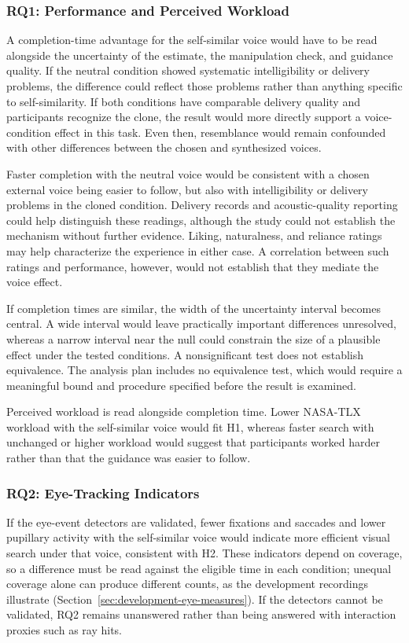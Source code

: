 \subsubsection{RQ1: Performance and Perceived Workload}
A completion-time advantage for the self-similar voice would have to be read alongside the uncertainty of the estimate, the manipulation check, and guidance quality. If the neutral condition showed systematic intelligibility or delivery problems, the difference could reflect those problems rather than anything specific to self-similarity. If both conditions have comparable delivery quality and participants recognize the clone, the result would more directly support a voice-condition effect in this task. Even then, resemblance would remain confounded with other differences between the chosen and synthesized voices.

Faster completion with the neutral voice would be consistent with a chosen external voice being easier to follow, but also with intelligibility or delivery problems in the cloned condition. Delivery records and acoustic-quality reporting could help distinguish these readings, although the study could not establish the mechanism without further evidence. Liking, naturalness, and reliance ratings may help characterize the experience in either case. A correlation between such ratings and performance, however, would not establish that they mediate the voice effect.

If completion times are similar, the width of the uncertainty interval becomes central. A wide interval would leave practically important differences unresolved, whereas a narrow interval near the null could constrain the size of a plausible effect under the tested conditions. A nonsignificant test does not establish equivalence. The analysis plan includes no equivalence test, which would require a meaningful bound and procedure specified before the result is examined.

Perceived workload is read alongside completion time. Lower NASA-TLX workload with the self-similar voice would fit H1, whereas faster search with unchanged or higher workload would suggest that participants worked harder rather than that the guidance was easier to follow.

\subsubsection{RQ2: Eye-Tracking Indicators}
If the eye-event detectors are validated, fewer fixations and saccades and lower pupillary activity with the self-similar voice would indicate more efficient visual search under that voice, consistent with H2. These indicators depend on coverage, so a difference must be read against the eligible time in each condition; unequal coverage alone can produce different counts, as the development recordings illustrate (Section~\ref{sec:development-eye-measures}). If the detectors cannot be validated, RQ2 remains unanswered rather than being answered with interaction proxies such as ray hits.


